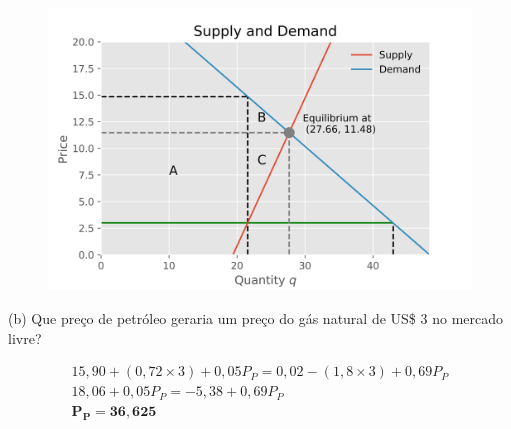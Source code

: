 \documentclass[12pt]{article}
\begin{document}
\begin{figure}[H]
    \includegraphics{curve_ex10.png}
\end{figure}

(b) Que preço de petróleo geraria um preço do gás natural de US\$ 3 no mercado livre?

\begin{gather*}
    15,90 + (0,72 \times 3) + 0,05P_P = 0,02 - (1,8 \times 3) + 0,69P_P \\
    18,06 + 0,05P_P = -5,38 + 0,69P_P \\
    \bm{P_P = 36,625}
\end{gather*}
\end{document}
